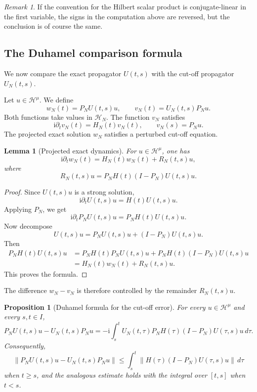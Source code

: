 \documentclass[11pt]{amsart}
\theoremstyle{plain}
\newtheorem{proposition}[theorem]{Proposition}
\newtheorem{lemma}[theorem]{Lemma}
\theoremstyle{definition}
\theoremstyle{remark}
\newtheorem{remark}[theorem]{Remark}
\newcommand{\Hilb}{\mathcal H}
\newcommand{\ii}{\mathrm i}
\begin{document}
\begin{remark}
If the convention for the Hilbert scalar product is conjugate-linear in
the first variable, the signs in the computation above are reversed,
but the conclusion is of course the same.
\end{remark}

\subsection{The Duhamel comparison formula}

We now compare the exact propagator \(U(t,s)\) with the cut-off
propagator \(U_N(t,s)\).

Let \(u\in\Hilb^\mu\).  We define
\[
        w_N(t)=P_NU(t,s)u,
        \qquad
        v_N(t)=U_N(t,s)P_Nu.
\]
Both functions take values in \(\Hilb_N\).  The function \(v_N\)
satisfies
\[
        \ii\partial_t v_N(t)=H_N(t)v_N(t),
        \qquad
        v_N(s)=P_Nu.
\]
The projected exact solution \(w_N\) satisfies a perturbed cut-off
equation.

\begin{lemma}[Projected exact dynamics]
\label{lem:projected-exact}
For \(u\in\Hilb^\mu\), one has
\[
        \ii\partial_t w_N(t)
        =
        H_N(t)w_N(t)
        +
        R_N(t,s)u,
\]
where
\[
        R_N(t,s)u
        =
        P_NH(t)(I-P_N)U(t,s)u.
\]
\end{lemma}

\begin{proof}
Since \(U(t,s)u\) is a strong solution,
\[
        \ii\partial_t U(t,s)u=H(t)U(t,s)u.
\]
Applying \(P_N\), we get
\[
        \ii\partial_t P_NU(t,s)u
        =
        P_NH(t)U(t,s)u.
\]
Now decompose
\[
        U(t,s)u=P_NU(t,s)u+(I-P_N)U(t,s)u.
\]
Then
\[
\begin{aligned}
        P_NH(t)U(t,s)u
        &=
        P_NH(t)P_NU(t,s)u
        +
        P_NH(t)(I-P_N)U(t,s)u     \\
        &=
        H_N(t)w_N(t)
        +
        R_N(t,s)u.
\end{aligned}
\]
This proves the formula.
\end{proof}

The difference \(w_N-v_N\) is therefore controlled by the remainder
\(R_N(t,s)u\).

\begin{proposition}[Duhamel formula for the cut-off error]
\label{prop:duhamel-cutoff}
For every \(u\in\Hilb^\mu\) and every \(s,t\in I\),
\[
        P_NU(t,s)u-U_N(t,s)P_Nu
        =
        -\ii
        \int_s^t
        U_N(t,\tau)
        P_NH(\tau)(I-P_N)U(\tau,s)u
        \,d\tau .
\]
Consequently,
\[
        \|P_NU(t,s)u-U_N(t,s)P_Nu\|
        \leq
        \int_s^t
        \|H(\tau)(I-P_N)U(\tau,s)u\|
        \,d\tau
\]
when \(t\geq s\), and the analogous estimate holds with the integral
over \([t,s]\) when \(t<s\).
\end{proposition}
\end{document}
